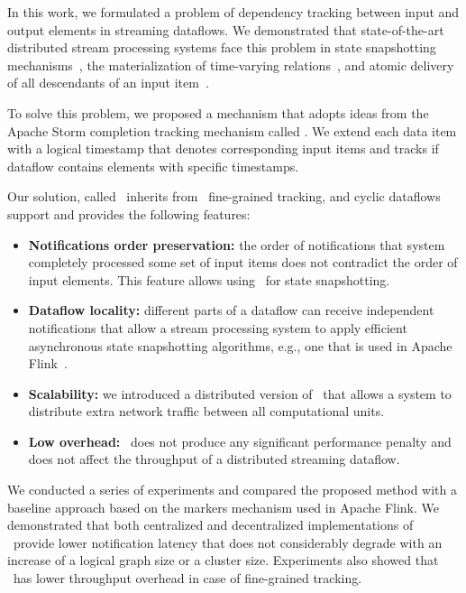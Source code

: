 \label {fs-acker-conclusion}

In this work, we formulated a problem of dependency tracking between input and output elements in streaming dataflows. We demonstrated that state-of-the-art distributed stream processing systems face this problem in state snapshotting mechanisms~\cite{Carbone:2017:SMA:3137765.3137777, apache:storm}, the materialization of time-varying relations~\cite{Begoli:2019:OSR:3299869.3314040}, and atomic delivery of all descendants of an input item~\cite{we2018adbis}.  

To solve this problem, we proposed a mechanism that adopts ideas from the Apache Storm completion tracking mechanism called \acker. We extend each data item with a logical timestamp that denotes corresponding input items and tracks if dataflow contains elements with specific timestamps. 

Our solution, called \tracker\ inherits from \acker\ fine-grained tracking, and cyclic dataflows support and provides the following features:
\begin{itemize}
    \item {\bf Notifications order preservation:} the order of notifications that system completely processed some set of input items does not contradict the order of input elements. This feature allows using \tracker\ for state snapshotting.
    \item {\bf Dataflow locality:} different parts of a dataflow can receive independent notifications that allow a stream processing system to apply efficient asynchronous state snapshotting algorithms, e.g., one that is used in Apache Flink~\cite{Carbone:2017:SMA:3137765.3137777}. 
    \item {\bf Scalability:} we introduced a distributed version of \tracker\ that allows a system to distribute extra network traffic between all computational units. 
    \item {\bf Low overhead:} \tracker\ does not produce any significant performance penalty and does not affect the throughput of a distributed streaming dataflow.
\end{itemize}

We conducted a series of experiments and compared the proposed method with a baseline approach based on the markers mechanism used in Apache Flink. We demonstrated that both centralized and decentralized implementations of \tracker\ provide lower notification latency that does not considerably degrade with an increase of a logical graph size or a cluster size. Experiments also showed that \tracker\ has lower throughput overhead in case of fine-grained tracking.